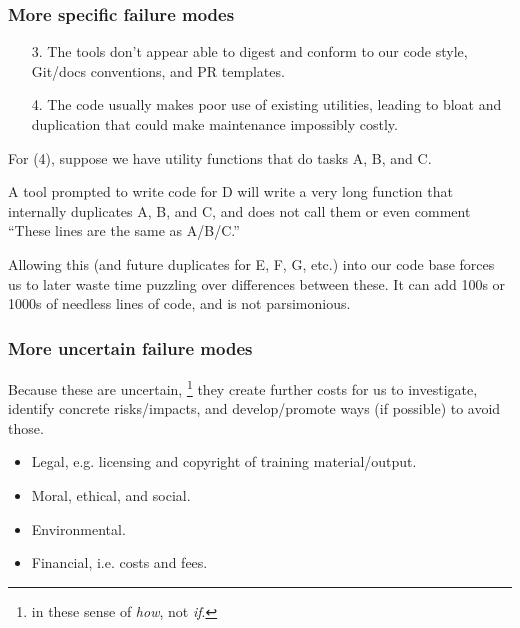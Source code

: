 \documentclass[12pt,aspectratio=169]{beamer}
\begin{document}
\begin{frame}
\frametitle{More specific failure modes}

\begin{enumerate}
  \item [3.] The tools don't appear able to digest and conform to our code style,
    Git/docs conventions,
    and PR templates.
  \item [4.] The code usually makes poor use of existing utilities,
    leading to bloat and duplication
    that could make maintenance impossibly costly.
\end{enumerate}

\medskip
For (4), suppose we have utility functions that do tasks A, B, and C.

\medskip
A tool prompted to write code for D will write a very long function that internally duplicates A, B, and C, and does not call them or even comment “These lines are the same as A/B/C.”

\medskip
Allowing this (and future duplicates for E, F, G, etc.) into our code base forces us to later waste time puzzling over differences between these.
It can add 100s or 1000s of needless lines of code, and is not parsimonious.
\end{frame}

\begin{frame}
\frametitle{More uncertain failure modes}

Because these are uncertain,%
\footnote{in these sense of \emph{how}, not \emph{if}.}
they create further costs for us to investigate,
identify concrete risks/impacts,
and develop/promote ways (if possible) to avoid those.

\medskip
\begin{itemize}
  \item Legal, e.g. licensing and copyright of training material/output.
  \item Moral, ethical, and social.
  \item Environmental.
  \item Financial, i.e. costs and fees.
\end{itemize}
\end{frame}
\end{document}
